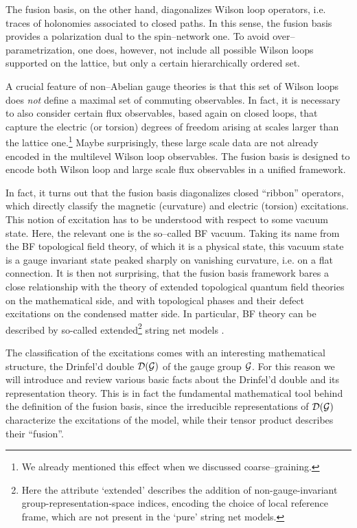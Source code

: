 \documentclass[nofootinbib,superscriptaddress,eqsecnum,tightenlines,11pt]{revtex4-1}
\def\mG{\mathcal{G}}
\begin{document}
The fusion basis, on the other hand, diagonalizes Wilson loop operators, i.e. traces of holonomies associated to closed paths. 
In this sense, the fusion basis provides a polarization dual to the spin--network one.
To avoid over--parametrization, one does, however, not include all possible Wilson loops supported on the lattice, but only a certain hierarchically ordered set. 


A crucial feature of non--Abelian gauge theories is that this set of Wilson loops does {\it not} define a maximal set of commuting observables. In fact, it is necessary to also consider certain flux observables, based again on closed loops, that capture the electric (or torsion) degrees of freedom arising at scales larger than the lattice one.\footnote{We already mentioned this effect when we discussed coarse--graining.}
Maybe surprisingly, these large scale data are not already encoded in the multilevel Wilson loop observables.
The fusion basis is designed to encode both Wilson loop and large scale flux observables in a unified framework.


In fact, it turns out that the fusion basis diagonalizes closed ``ribbon'' operators, which directly classify the magnetic (curvature) and electric (torsion) excitations. 
This notion of excitation has to be understood with respect to some vacuum state.
Here, the relevant one is the so--called BF vacuum.
Taking its name from the BF topological field theory, of which it is a physical state, this vacuum state is a gauge invariant state peaked sharply on vanishing curvature, i.e. on a flat connection. 
It is then not surprising, that the fusion basis framework bares a close relationship with the theory of extended topological quantum field theories on the mathematical side, and with topological phases and their defect excitations on the condensed matter side. 
In particular, BF theory can be described by so-called extended\footnote{Here the attribute `extended' describes the addition of non-gauge-invariant group-representation-space indices,  encoding the choice of local reference frame, which are not present in the `pure' string net models.} string net models \cite{LevinWen, Buersch}.  

The classification of the excitations comes with an interesting mathematical structure, the Drinfel'd double ${\cal D}(\mG)$ of the gauge group ${\cal G}$. For this reason we will introduce and review various basic facts about the Drinfel'd double and its representation theory. This is in fact the fundamental mathematical tool behind the definition of the fusion basis, since the irreducible representations of ${\cal D}(\mG)$ characterize  the excitations of the model, while their tensor product describes their ``fusion''. %
\end{document}
